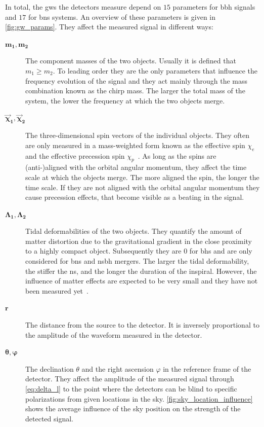 In total, the \acrshort{gw}s the detectors measure depend on $15$ parameters for \acrshort{bbh} signals and $17$ for \acrshort{bns} systems. An overview of these parameters is given in \autoref{fig:gw_params}. They affect the measured signal in different ways:
\begin{description}
	\item[$\bm{m_1, m_2}$] The component masses of the two objects. Usually it is defined that $m_1\geq m_2$. To leading order they are the only parameters that influence the frequency evolution of the signal and they act mainly through the mass combination known as the chirp mass. The larger the total mass of the system, the lower the frequency at which the two objects merge.
	\item[$\bm{\vec{\chi}_1, \vec{\chi}_2}$] The three-dimensional spin vectors of the individual objects. They often are only measured in a mass-weighted form known as the effective spin $\chi_e$~\cite{Schmidt:2012rh} and the effective precession spin $\chi_p$~\cite{Schmidt:2014iyl}. As long as the spins are (anti-)aligned with the orbital angular momentum, they affect the time scale at which the objects merge. The more aligned the spin, the longer the time scale. If they are not aligned with the orbital angular momentum they cause precession effects, that become visible as a beating in the signal.
	\item[$\bm{\Lambda_1, \Lambda_2}$] Tidal deformabilities of the two objects. They quantify the amount of matter distortion due to the gravitational gradient in the close proximity to a highly compact object. Subsequently they are $0$ for \acrshort{bh}s and are only considered for \acrshort{bns} and \acrshort{nsbh} mergers. The larger the tidal deformability, the stiffer the \acrshort{ns}, and the longer the duration of the inspiral. However, the influence of matter effects are expected to be very small and they have not been measured yet~\cite{LIGOScientific:2021djp}.
	\item[$\bm{r}$] The distance from the source to the detector. It is inversely proportional to the amplitude of the waveform measured in the detector.
	\item[$\bm{\theta, \varphi}$] The declination $\theta$ and the right ascension $\varphi$ in the reference frame of the detector. They affect the amplitude of the measured signal through \eqref{eq:delta_l} to the point where the detectors can be blind to specific polarizations from given locations in the sky. \autoref{fig:sky_location_influence} shows the average influence of the sky position on the strength of the detected signal.

\end{description}
